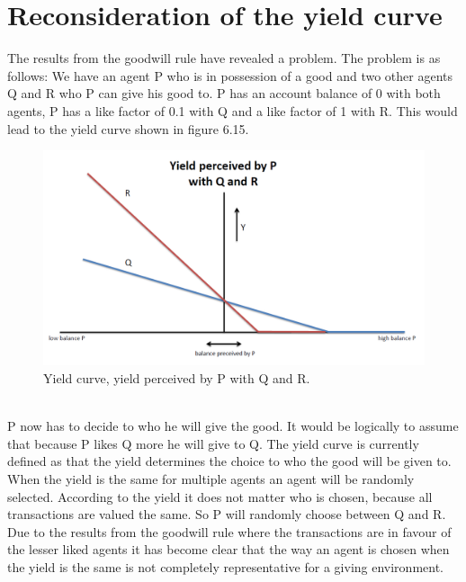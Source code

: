 \documentclass[twoside,openright]{uva-bachelor-thesis}
\begin{document}
\section{Reconsideration of the yield curve}
The results from the goodwill rule have revealed a problem. The problem is as follows: We have an agent P who is in possession of a good and two other agents Q and R who P can give his good to. P has an account balance of 0 with both agents, P has a like factor of 0.1 with Q and a like factor of 1 with R. This would lead to the yield curve shown in figure 6.15. \\
\begin{figure}[h!]
\centering
\includegraphics[scale=0.4]{YieldCurves/yieldcurve_P_QR}
\caption{Yield curve, yield perceived by P with Q and R.}
\end{figure}
\\
P now has to decide to who he will give the good. It would be logically to assume that because P likes Q more he will give to Q. The yield curve is currently defined as that the yield determines the choice to who the good will be given to. When the yield is the same for multiple agents an agent will be randomly selected. According to the yield it does not matter who is chosen, because all transactions are valued the same. So P will randomly choose between Q and R. Due to the results from the goodwill rule where the transactions are in favour of the lesser liked agents it has become clear that the way an agent is chosen when the yield is the same is not completely representative for a giving environment.
\end{document}
